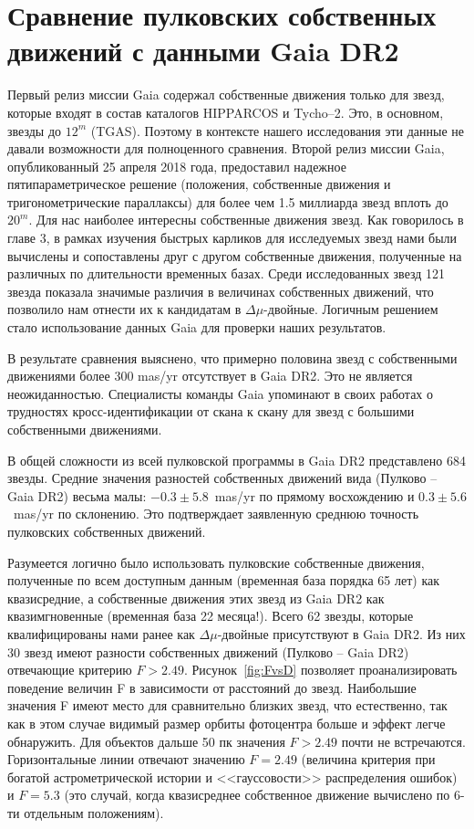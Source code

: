 \chapter{Сравнение пулковских собственных движений с данными Gaia DR2} \label{ch:ch6}
Первый релиз миссии Gaia содержал собственные движения только для звезд, которые входят в состав каталогов HIPPARCOS и Tycho--2. Это, в основном, звезды до $12^m$ (TGAS). Поэтому в контексте нашего исследования эти данные не давали возможности для полноценного сравнения. Второй релиз миссии Gaia, опубликованный 25 апреля 2018 года, предоставил надежное пятипараметрическое решение (положения, собственные движения и тригонометрические параллаксы) для более чем 1.5 миллиарда звезд  вплоть до $20^m$. Для нас наиболее интересны собственные движения звезд. Как говорилось в главе 3, в рамках изучения быстрых карликов для исследуемых звезд нами  были вычислены и сопоставлены друг с другом собственные движения, полученные на различных по длительности временных базах. Среди исследованных звезд 121 звезда показала значимые различия в величинах собственных движений, что позволило нам отнести их к кандидатам в $\Delta\mu$-двойные. Логичным решением стало использование данных Gaia для проверки наших результатов.

В результате сравнения выяснено, что примерно половина звезд с собственными движениями более 300 mas/yr отсутствует в Gaia DR2. Это не является неожиданностью. Специалисты команды Gaia упоминают в своих работах \cite{2018A&A...616A...2L} о трудностях кросс-идентификации от скана к скану для звезд с большими собственными движениями.

В общей сложности из всей пулковской программы в Gaia DR2 представлено 684 звезды. Средние значения разностей собственных движений вида (Пулково -- Gaia DR2) весьма малы: $-0.3\pm5.8$~mas/yr по прямому восхождению и $0.3\pm5.6$~mas/yr по склонению. Это подтверждает заявленную среднюю точность пулковских собственных движений.

Разумеется логично было использовать пулковские собственные движения, полученные по всем доступным данным (временная база порядка 65 лет) как квазисредние, а собственные движения этих звезд из Gaia DR2 как квазимгновенные (временная база 22 месяца!). Всего 62 звезды, которые квалифицированы нами ранее как $\Delta\mu$-двойные присутствуют в Gaia DR2. Из них 30 звезд имеют разности собственных движений  (Пулково -- Gaia DR2) отвечающие критерию $F>2.49$. Рисунок~\ref{fig:FvsD} позволяет проанализировать поведение величин F в зависимости от расстояний до звезд. Наибольшие значения F имеют место для сравнительно близких звезд, что естественно, так как в этом случае видимый размер орбиты фотоцентра больше и эффект легче обнаружить. Для объектов дальше 50 пк значения $F>2.49$ почти не встречаются. Горизонтальные линии отвечают значению $F=2.49$ (величина критерия при богатой астрометрической истории и <<гауссовости>> распределения ошибок) и $F=5.3$ (это случай, когда квазисреднее собственное движение вычислено по 6-ти отдельным положениям).

